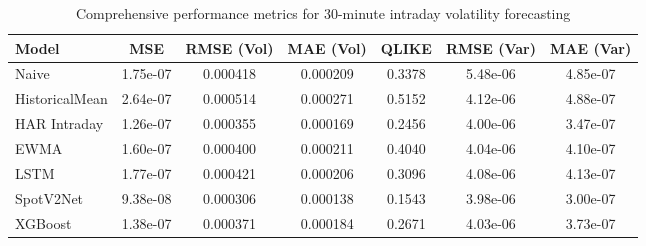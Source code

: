 \documentclass[journal]{IEEEtran}
\begin{document}
\begin{table*}[!t]
\centering
\caption{Comprehensive performance metrics for 30-minute intraday volatility forecasting}
\label{tab:comprehensive_results}
\begin{tabular}{@{}lS[table-format=1.2e-1]S[table-format=1.6]S[table-format=1.6]S[table-format=1.4]S[table-format=1.2e-1]S[table-format=1.2e-1]@{}}
\toprule
{Model} & {MSE} & {RMSE (Vol)} & {MAE (Vol)} & {QLIKE} & {RMSE (Var)} & {MAE (Var)} \\
\midrule
{}Naive & 1.75e-07 & 0.000418 & 0.000209 & 0.3378 & 5.48e-06 & 4.85e-07 \\
HistoricalMean & 2.64e-07 & 0.000514 & 0.000271 & 0.5152 & 4.12e-06 & 4.88e-07 \\
HAR Intraday & 1.26e-07 & 0.000355 & 0.000169 & 0.2456 & 4.00e-06 & 3.47e-07 \\
EWMA & 1.60e-07 & 0.000400 & 0.000211 & 0.4040 & 4.04e-06 & 4.10e-07 \\
LSTM & 1.77e-07 & 0.000421 & 0.000206 & 0.3096 & 4.08e-06 & 4.13e-07 \\
SpotV2Net & 9.38e-08 & 0.000306 & 0.000138 & 0.1543 & 3.98e-06 & 3.00e-07 \\
XGBoost & 1.38e-07 & 0.000371 & 0.000184 & 0.2671 & 4.03e-06 & 3.73e-07 \\
\bottomrule
\end{tabular}
\end{table*}
\end{document}

